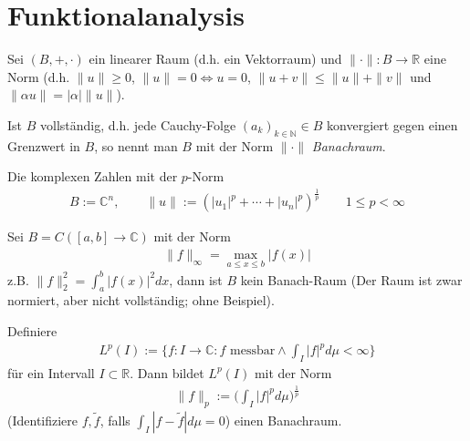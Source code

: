 %

\section{Funktionalanalysis} %
\addtocounter{thmn}{1}
\setcounter{theorem}{0}


\begin{theorem}[Definition] \label{thm:1.1}
  Sei $(B,+,\cdot)$ ein linearer Raum (d.h. ein Vektorraum) und $\|\cdot\|: B \to \mathbb{R}$ eine Norm (d.h. $\|u\| \ge 0$, $\|u\|=0 \iff u = 0$, $\|u+v\| \le \|u\| + \|v\|$ und $\|\alpha u \| = |\alpha| \|u\|$).

  Ist $B$ vollständig, d.h. jede Cauchy-Folge $(a_k)_{k\in \mathbb{N}} \in B$ konvergiert gegen einen Grenzwert in $B$, so nennt man $B$ mit der Norm $\|\cdot\|$ \emph{Banachraum}.
\end{theorem}

\begin{example} \label{thm:1.2}
  \begin{enum-arab}
  \item
    Die komplexen Zahlen mit der $p$-Norm
    \begin{align*}
      B := \mathbb{C}^n,
      \qquad \|u\| := (|u_1|^p + \dotsb + |u_n|^p)^{\frac 1p} \qquad 1 \le p < \infty
    \end{align*}
  \item
    Sei $B = C([a,b] \to \mathbb{C})$ mit der Norm
    \begin{align*}
      \|f\|_\infty = \max_{a \le x \le b} |f(x)|
    \end{align*}
    z.B. $\|f\|_2^2 = \int_a^b |f(x)|^2 dx$, dann ist $B$ kein Banach-Raum (Der Raum ist zwar normiert, aber nicht vollständig; ohne Beispiel).
  \item
    Definiere
    \begin{align*}
      L^p(I) := \bigg\{ f : I \to \mathbb{C} : f \text{ messbar} \land \int_I |f|^p d\mu < \infty \bigg\}
    \end{align*}
    für ein Intervall $I \subset \mathbb{R}$.
    Dann bildet $L^p(I)$ mit der Norm
    \begin{align*}
      \|f\|_p := \bigg( \int_I |f|^p d\mu \bigg)^{\frac 1p}
    \end{align*}
    (Identifiziere $f,\tilde f$, falls $\int_I |f-\tilde f| d\mu = 0$)
    einen Banachraum.
  \end{enum-arab}
\end{example}


